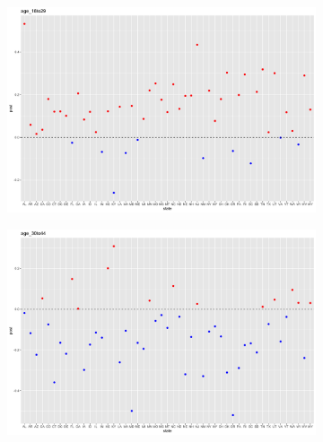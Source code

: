 \documentclass[11pt]{article}
\begin{document}
\begin{figure}
    \centering
    \begin{subfigure}[t]{0.9\textwidth}
        \centering
        \includegraphics[width=\linewidth]{Ex5/figures/2post covariates5.png} 
    \end{subfigure}
    \hfill
    \begin{subfigure}[t]{0.9\textwidth}
        \centering
        \includegraphics[width=\linewidth]{Ex5/figures/2post covariates6.png} 
    \end{subfigure}
\end{figure}
\end{document}
